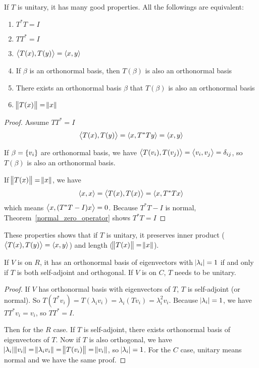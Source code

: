 If $T$ is unitary, it has many good properties. All the followings are equivalent:
\begin{enumerate}
    \item $T^*T = I$
    \item $TT^* = I$
    \item $\left\langle \displaystyle T(x), T(y) \right\rangle = \left\langle \displaystyle x, y \right\rangle$
    \item If $\beta$ is an orthonormal basis, then $T(\beta)$ is also an orthonormal basis
    \item There exists an orthonormal basis $\beta$ that $T(\beta)$ is also an orthonormal basis
    \item $\norm{T(x)} = \norm{x}$
\end{enumerate}
\begin{proof}
    Assume $TT^* = I$
    \begin{equation*}
        \left\langle \displaystyle T(x), T(y) \right\rangle = \left\langle \displaystyle x, T^*Ty \right\rangle = \left\langle \displaystyle x, y \right\rangle
    \end{equation*}
    
    If $\beta = \set{v_i}$ are orthonormal basis, we have $\left\langle \displaystyle T(v_i), T(v_j) \right\rangle = \left\langle \displaystyle v_i, v_j \right\rangle = \delta_{ij}$, so $T(\beta)$ is also an orthonormal basis.
    
    If $\norm{T(x)} = \norm{x}$, we have 
    \begin{equation*}
        \left\langle \displaystyle x, x \right\rangle = \left\langle \displaystyle T(x), T(x) \right\rangle = \left\langle \displaystyle x, T^*Tx \right\rangle
    \end{equation*}
    which means $\left\langle \displaystyle x, (T^*T - I)x \right\rangle = 0$. Because $T^*T - I$ is normal, Theorem~\ref{normal_zero_operator} shows $T^*T = I$
\end{proof}

These properties shows that if $T$ is unitary, it preserves inner product ($\left\langle \displaystyle T(x), T(y) \right\rangle = \left\langle \displaystyle x, y \right\rangle$) and length ($\norm{T(x)} = \norm{x}$).

\begin{theorem}
    If $V$ is on $R$, it has an orthonormal basis of eigenvectors with $\abs{\lambda_i} = 1$ if and only if $T$ is both self-adjoint and orthogonal.     
    If $V$ is on $C$, $T$ needs to be unitary.
\end{theorem}
\begin{proof}
    If $V$ has orthonormal basis with eigenvectors of $T$, $T$ is self-adjoint (or normal). So $T(T^* v_i) = T (\lambda_i v_i) = \lambda_i (T v_i) = \lambda_i^2 v_i$. Because $\abs{\lambda_i} = 1$, we have $TT^* v_i = v_i$, so $TT^* = I$.
    
    Then for the $R$ case. If $T$ is self-adjoint, there exists orthonormal basis of eigenvectors of $T$. Now if $T$ is also orthogonal, we have $\abs{\lambda_i} \norm{v_i} = \norm{\lambda_i v_i} = \norm{T (v_i)} = \norm{v_i}$, so $\abs{\lambda_i} = 1$. For the $C$ case, unitary means normal and we have the same proof.
\end{proof}


